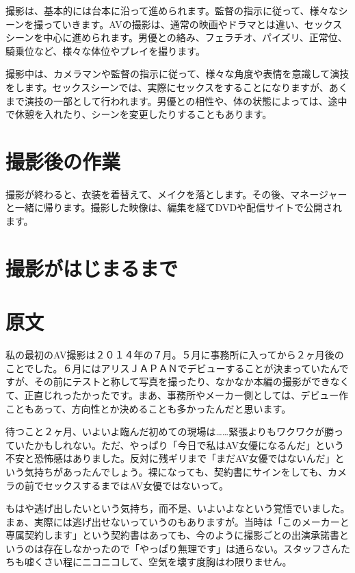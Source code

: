 \documentclass[12pt,UTF8]{ctexbook}
\begin{document}
撮影は、基本的には台本に沿って進められます。監督の指示に従って、様々なシーンを撮っていきます。AVの撮影は、通常の映画やドラマとは違い、セックスシーンを中心に進められます。男優との絡み、フェラチオ、パイズリ、正常位、騎乗位など、様々な体位やプレイを撮ります。

撮影中は、カメラマンや監督の指示に従って、様々な角度や表情を意識して演技をします。セックスシーンでは、実際にセックスをすることになりますが、あくまで演技の一部として行われます。男優との相性や、体の状態によっては、途中で休憩を入れたり、シーンを変更したりすることもあります。

\section{撮影後の作業}

撮影が終わると、衣装を着替えて、メイクを落とします。その後、マネージャーと一緒に帰ります。撮影した映像は、編集を経てDVDや配信サイトで公開されます。

\section{撮影がはじまるまで}



\section*{原文}

私の最初のAV撮影は２０１４年の７月。５月に事務所に入ってから２ヶ月後のことでした。６月にはアリスＪＡＰＡＮでデビューすることが決まっていたんですが、その前にテストと称して写真を撮ったり、なかなか本編の撮影ができなくて、正直じれったかったです。まあ、事務所やメーカー側としては、デビュー作こともあって、方向性とか決めることも多かったんだと思います。

待つこと２ヶ月、いよいよ臨んだ初めての現場は……緊張よりもワクワクが勝っていたかもしれない。ただ、やっぱり「今日で私はAV女優になるんだ」という不安と恐怖感はありました。反対に残ギリまで「まだAV女優ではないんだ」という気持ちがあったんでしょう。裸になっても、契約書にサインをしても、カメラの前でセックスするまではAV女優ではないって。

もはや逃げ出したいという気持ち，而不是、いよいよなという覚悟でいました。まぁ、実際には逃げ出せないっていうのもありますが。当時は「このメーカーと専属契約します」という契約書はあっても、今のように撮影ごとの出演承諾書というのは存在しなかったので「やっぱり無理です」は通らない。スタッフさんたちも嘘くさい程にニコニコして、空気を壊す度胸はわ限りません。
\end{document}
